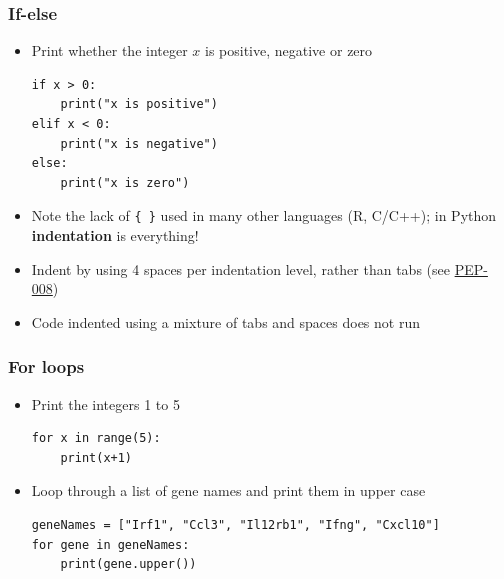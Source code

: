 \documentclass[xcolor=table]{beamer}
\begin{document}
\begin{frame}[fragile]
\frametitle{If-else}

\begin{itemize}
	\item Print whether the integer $x$ is positive, negative or zero

\begin{lstlisting}[style=python]
if x > 0:
    print("x is positive")
elif x < 0:
    print("x is negative")
else:
    print("x is zero")
\end{lstlisting}

    \item Note the lack of \texttt{\{ \}} used in many other languages (R, C/C++); in Python \textbf{indentation} is everything!
    \item Indent by using 4 spaces per indentation level, rather than tabs (see \href{https://www.python.org/dev/peps/pep-0008/#indentation}{PEP-008})
    \item Code indented using a mixture of tabs and spaces does not run
\end{itemize}

\end{frame}

\begin{frame}[fragile]
\frametitle{For loops}

\begin{itemize}

\item<1-> Print the integers 1 to 5
\begin{lstlisting}[style=python]
for x in range(5):
    print(x+1)
\end{lstlisting}

\item<2-> Loop through a list of gene names and print them in upper case
\begin{lstlisting}[style=python]
geneNames = ["Irf1", "Ccl3", "Il12rb1", "Ifng", "Cxcl10"]
for gene in geneNames:
    print(gene.upper())
\end{lstlisting}

\end{itemize}

\end{frame}
\end{document}
